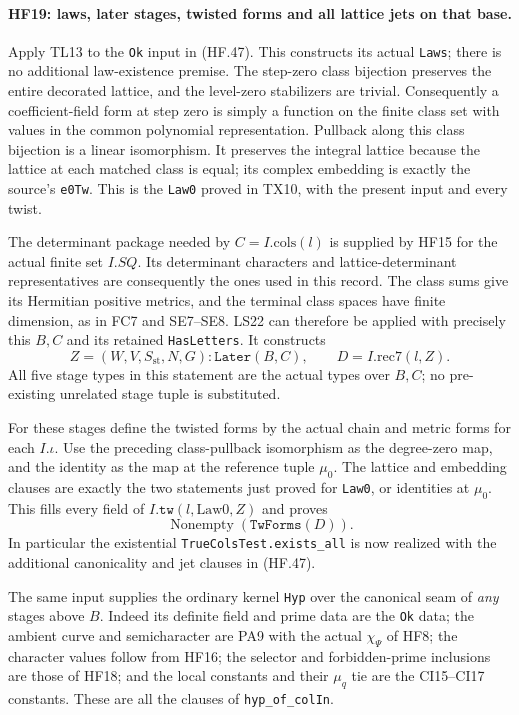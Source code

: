 \paragraph{HF19: laws, later stages, twisted forms and all lattice jets on that base.}
Apply TL13 to the \texttt{Ok} input in (HF.47).
This constructs its actual \texttt{Laws}; there
is no additional law-existence premise. The
step-zero class bijection preserves the entire
decorated lattice, and the level-zero stabilizers
are trivial. Consequently a coefficient-field
form at step zero is simply a function on the
finite class set with values in the common
polynomial representation. Pullback along this
class bijection is a linear isomorphism. It
preserves the integral lattice because the
lattice at each matched class is equal; its
complex embedding is exactly the source's
\texttt{e0Tw}. This is the \texttt{Law0} proved
in TX10, with the present input and every twist.

The determinant package needed by
$C=I.\mathrm{cols}(l)$ is supplied by HF15 for the
actual finite set $I.SQ$. Its determinant
characters and lattice-determinant representatives
are consequently the ones used in this record.
The class sums give its Hermitian positive
metrics, and the terminal class spaces have
finite dimension, as in FC7 and SE7--SE8.
LS22 can therefore be applied with precisely
this $B,C$ and its retained \texttt{HasLetters}.
It constructs
\[
 Z=(W,V,S_{\mathrm{st}},N,G):
                  \texttt{Later}(B,C),\qquad
 D=I.\mathrm{rec7}(l,Z).
 \tag{HF.48}
\]
All five stage types in this statement are the
actual types over $B,C$; no pre-existing unrelated
stage tuple is substituted.

For these stages define the twisted forms by the
actual chain and metric forms for each $I.\iota$.
Use the preceding class-pullback isomorphism as
the degree-zero map, and the identity as the
map at the reference tuple $\mu_0$. The lattice
and embedding clauses are exactly the two
statements just proved for \texttt{Law0}, or
identities at $\mu_0$. This fills every field of
$I.\texttt{tw}(l,\mathrm{Law0},Z)$ and proves
\[
           \operatorname{Nonempty}(\texttt{TwForms}(D)).
 \tag{HF.49}
\]
In particular the existential
\texttt{TrueColsTest.exists\_all} is now realized
with the additional canonicality and jet clauses
in (HF.47).

The same input supplies the ordinary kernel
\texttt{Hyp} over the canonical seam of
\emph{any} stages above $B$. Indeed its definite
field and prime data are the \texttt{Ok} data;
the ambient curve and semicharacter are PA9 with
the actual $\chi_\Psi$ of HF8; the character
values follow from HF16; the selector and
forbidden-prime inclusions are those of HF18;
and the local constants and their $\mu_q$ tie
are the CI15--CI17 constants. These are all the
clauses of \texttt{hyp\_of\_colIn}.

